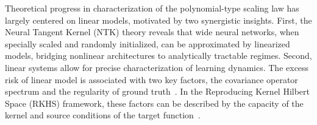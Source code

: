 \fi 


Theoretical progress in characterization of the polynomial-type scaling law has largely centered on linear models, motivated by two synergistic insights. First, the Neural Tangent Kernel (NTK) theory \citep{NEURIPS2018_5a4be1fa,arora2019exact} reveals that wide neural networks, when specially scaled and randomly initialized, can be approximated by linearized models, bridging nonlinear architectures to analytically tractable regimes. Second, linear systems allow for precise characterization of learning dynamics.  The excess risk of linear model is associated with two key factors, the covariance operator spectrum and the regularity of ground truth~\citep{lin2024scaling,bahri2024explaining}.   In the Reproducing Kernel Hilbert Space (RKHS) framework, 
these factors can be described by the capacity of the kernel and source conditions of the target function~\citep{caponnetto2007optimal}. 




